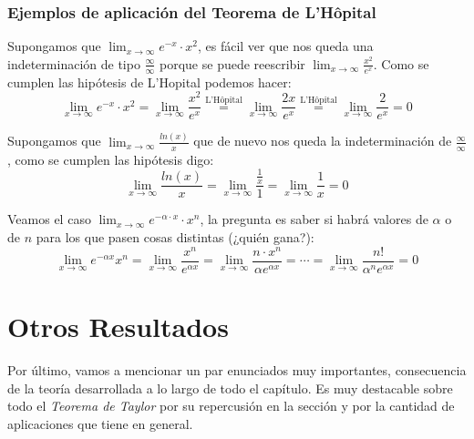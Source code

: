 \documentclass[10pt,a4paper,openright]{book}
\theoremstyle{break}
\begin{document}
\subsubsection{Ejemplos de aplicación del Teorema de L'Hôpital}
Supongamos que $\lim_{x\rightarrow \infty} e^{-x} \cdot x^2$, es fácil ver que nos queda una indeterminación de tipo $\frac{\infty}{\infty}$ porque se puede reescribir $\lim_{x\rightarrow \infty}\frac{x^2}{e^x}$. Como se cumplen las hipótesis de L'Hopital podemos hacer:
$$\lim_{x\rightarrow \infty} e^{-x} \cdot x^2=\lim_{x\rightarrow \infty}\frac{x^2}{e^x}\stackrel{\mbox{L'Hôpital}}{=}\lim_{x\rightarrow \infty}\frac{2x}{e^x}\stackrel{\mbox{L'Hôpital}}{=}\lim_{x\rightarrow \infty}\frac{2}{e^x}=0$$

Supongamos que $\lim_{x\rightarrow \infty}\frac{ln(x)}{x}$ que de nuevo nos queda la indeterminación de $\frac{\infty}{\infty}$, como se cumplen las hipótesis digo:
$$\lim_{x\rightarrow \infty} \frac{ln(x)}{x}=\lim_{x\rightarrow \infty}\frac{\frac{1}{x}}{1}=\lim_{x\rightarrow \infty}\frac{1}{x}=0$$

Veamos el caso $\lim_{x\rightarrow \infty} e^{-\alpha \cdot x}\cdot x^n$, la pregunta es saber si habrá valores de $\alpha$ o de $n$ para los que pasen cosas distintas (¿quién gana?):
$$\lim_{x\rightarrow \infty} e^{-\alpha x}x^n=\lim_{x\rightarrow \infty}\frac{x^n}{e^{\alpha x}}=\lim_{x\rightarrow \infty} \frac{n\cdot x^n}{\alpha e^{\alpha x}}=\cdots =\lim_{x\rightarrow \infty} \frac{n!}{\alpha^n e^{\alpha x}}=0$$

\section{Otros Resultados}
Por último, vamos a mencionar un par enunciados muy importantes, consecuencia de la teoría desarrollada a lo largo de todo el capítulo. Es muy destacable sobre todo el \textit{Teorema de Taylor} por su repercusión en la sección  y por la cantidad de aplicaciones que tiene en general. 
\end{document}
